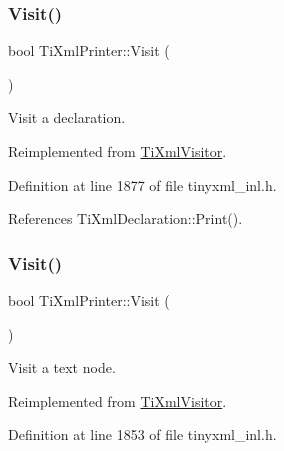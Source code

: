 \subsubsection{\texorpdfstring{Visit()}{Visit()}\hspace{0.1cm}{\footnotesize\ttfamily [1/4]}}
{\footnotesize\ttfamily bool Ti\+Xml\+Printer\+::\+Visit (\begin{DoxyParamCaption}\item[{const \hyperlink{class_ti_xml_declaration}{Ti\+Xml\+Declaration} \&}]{ }\end{DoxyParamCaption})\hspace{0.3cm}{\ttfamily [virtual]}}



Visit a declaration. 



Reimplemented from \hyperlink{class_ti_xml_visitor_afad71c71ce6473fb9b4b64cd92de4a19}{Ti\+Xml\+Visitor}.



Definition at line 1877 of file tinyxml\+\_\+inl.\+h.



References Ti\+Xml\+Declaration\+::\+Print().

\hypertarget{class_ti_xml_printer_a0857c5d32c59b9a257f9a49cb9411df5}{}\label{class_ti_xml_printer_a0857c5d32c59b9a257f9a49cb9411df5} 
\subsubsection{\texorpdfstring{Visit()}{Visit()}\hspace{0.1cm}{\footnotesize\ttfamily [2/4]}}
{\footnotesize\ttfamily bool Ti\+Xml\+Printer\+::\+Visit (\begin{DoxyParamCaption}\item[{const \hyperlink{class_ti_xml_text}{Ti\+Xml\+Text} \&}]{ }\end{DoxyParamCaption})\hspace{0.3cm}{\ttfamily [virtual]}}



Visit a text node. 



Reimplemented from \hyperlink{class_ti_xml_visitor_a399b8ebca5cd14664974a32d2ce029e5}{Ti\+Xml\+Visitor}.



Definition at line 1853 of file tinyxml\+\_\+inl.\+h.



